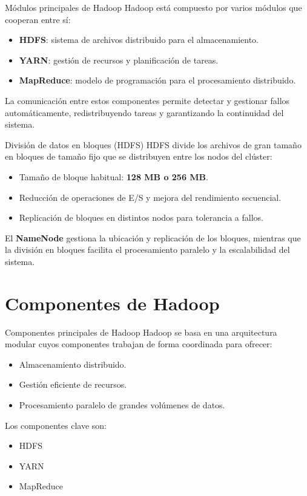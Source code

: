 \documentclass{beamer}
\begin{document}
\begin{frame}{Módulos principales de Hadoop}
Hadoop está compuesto por varios módulos que cooperan entre sí:
\begin{itemize}
    \item \textbf{HDFS}: sistema de archivos distribuido para el almacenamiento.
    \item \textbf{YARN}: gestión de recursos y planificación de tareas.
    \item \textbf{MapReduce}: modelo de programación para el procesamiento distribuido.
\end{itemize}

La comunicación entre estos componentes permite detectar y gestionar fallos automáticamente, redistribuyendo tareas y garantizando la continuidad del sistema.
\end{frame}

\begin{frame}{División de datos en bloques (HDFS)}
HDFS divide los archivos de gran tamaño en bloques de tamaño fijo que se distribuyen entre los nodos del clúster:
\begin{itemize}
    \item Tamaño de bloque habitual: \textbf{128 MB o 256 MB}.
    \item Reducción de operaciones de E/S y mejora del rendimiento secuencial.
    \item Replicación de bloques en distintos nodos para tolerancia a fallos.
\end{itemize}

El \textbf{NameNode} gestiona la ubicación y replicación de los bloques, mientras que la división en bloques facilita el procesamiento paralelo y la escalabilidad del sistema.
\end{frame}


\section{Componentes de Hadoop}

\begin{frame}{Componentes principales de Hadoop}
Hadoop se basa en una arquitectura modular cuyos componentes trabajan de forma coordinada para ofrecer:
\begin{itemize}
    \item Almacenamiento distribuido.
    \item Gestión eficiente de recursos.
    \item Procesamiento paralelo de grandes volúmenes de datos.
\end{itemize}

Los componentes clave son:
\begin{itemize}
    \item HDFS
    \item YARN
    \item MapReduce
\end{itemize}
\end{frame}
\end{document}
